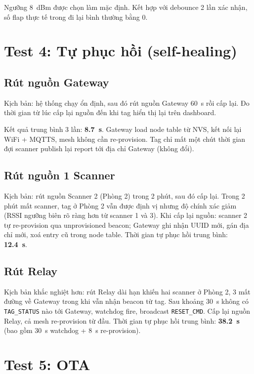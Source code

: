 Ngưỡng 8~dBm được chọn làm mặc định. Kết hợp với debounce 2 lần xác nhận, số flap thực tế trong đi lại bình thường bằng 0.

\section{Test 4: Tự phục hồi (self-healing)}

\subsection{Rút nguồn Gateway}

Kịch bản: hệ thống chạy ổn định, sau đó rút nguồn Gateway 60~s rồi cấp lại. Đo thời gian từ lúc cấp lại nguồn đến khi tag hiển thị lại trên dashboard.

Kết quả trung bình 3 lần: \textbf{8.7~s}. Gateway load node table từ NVS, kết nối lại WiFi + MQTTS, mesh không cần re-provision. Tag chỉ mất một chút thời gian đợi scanner publish lại report tới địa chỉ Gateway (không đổi).

\subsection{Rút nguồn 1 Scanner}

Kịch bản: rút nguồn Scanner 2 (Phòng 2) trong 2 phút, sau đó cấp lại. Trong 2 phút mất scanner, tag ở Phòng 2 vẫn được định vị nhưng độ chính xác giảm (RSSI ngưỡng biên rõ ràng hơn từ scanner 1 và 3). Khi cấp lại nguồn: scanner 2 tự re-provision qua unprovisioned beacon; Gateway ghi nhận UUID mới, gán địa chỉ mới, xoá entry cũ trong node table. Thời gian tự phục hồi trung bình: \textbf{12.4~s}.

\subsection{Rút Relay}

Kịch bản khắc nghiệt hơn: rút Relay dài hạn khiến hai scanner ở Phòng 2, 3 mất đường về Gateway trong khi vẫn nhận beacon từ tag. Sau khoảng 30~s không có \texttt{TAG\_STATUS} nào tới Gateway, watchdog fire, broadcast \texttt{RESET\_CMD}. Cấp lại nguồn Relay, cả mesh re-provision từ đầu. Thời gian tự phục hồi trung bình: \textbf{38.2~s} (bao gồm 30~s watchdog + 8~s re-provision).

\section{Test 5: OTA}

